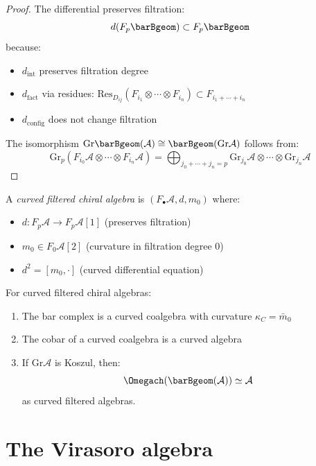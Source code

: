 \begin{proof}
The differential preserves filtration:
\[d(F_p\barBgeom) \subset F_p\barBgeom\]
because:
\begin{itemize}
\item $d_{\text{int}}$ preserves filtration degree
\item $d_{\text{fact}}$ via residues: $\text{Res}_{D_{ij}}(F_{i_1} \otimes \cdots \otimes F_{i_n}) \subset F_{i_1 + \cdots + i_n}$
\item $d_{\text{config}}$ does not change filtration
\end{itemize}

The isomorphism $\text{Gr}\barBgeom(\mathcal{A}) \cong \barBgeom(\text{Gr}\mathcal{A})$ follows from:
\[\text{Gr}_p(F_{i_0}\mathcal{A} \otimes \cdots \otimes F_{i_n}\mathcal{A}) = \bigoplus_{j_0 + \cdots + j_n = p} \text{Gr}_{j_0}\mathcal{A} \otimes \cdots \otimes \text{Gr}_{j_n}\mathcal{A}\]
\end{proof}

\begin{definition}
A \emph{curved filtered chiral algebra} is $(F_\bullet\mathcal{A}, d, m_0)$ where:
\begin{itemize}
\item $d: F_p\mathcal{A} \to F_p\mathcal{A}[1]$ (preserves filtration)
\item $m_0 \in F_0\mathcal{A}[2]$ (curvature in filtration degree 0)
\item $d^2 = [m_0, \cdot]$ (curved differential equation)
\end{itemize}
\end{definition}

\begin{theorem}
\label{thm:curved-koszul-duality}
For curved filtered chiral algebras:
\begin{enumerate}
\item The bar complex is a curved coalgebra with curvature $\kappa_C = \bar{m}_0$
\item The cobar of a curved coalgebra is a curved algebra
\item If $\text{Gr}\mathcal{A}$ is Koszul, then:
\[\Omegach(\barBgeom(\mathcal{A})) \simeq \mathcal{A}\]
as curved filtered algebras.
\end{enumerate}
\end{theorem}

\section{The Virasoro algebra}

